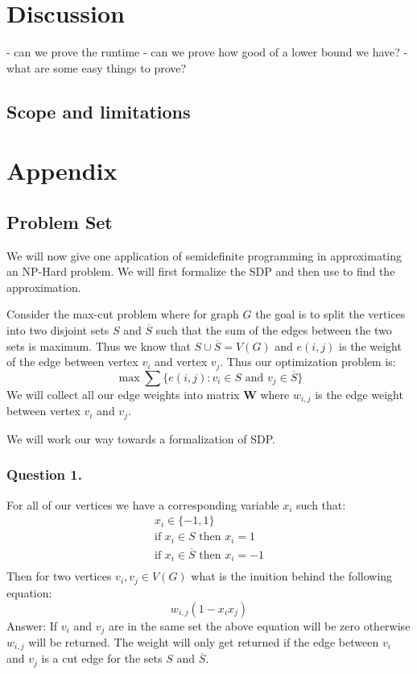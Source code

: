 \documentclass{article}
\begin{document}
\section{Discussion}


- can we prove the runtime
- can we prove how good of a lower bound we have?
- what are some easy things to prove?

\subsection{Scope and limitations}

\section{Appendix}
\subsection{Problem Set}
We will now give one application of semidefinite programming in approximating an NP-Hard problem.
We will first formalize the SDP and then use to find the approximation.

Consider the max-cut problem where for graph \( G \) the goal is to split the vertices into two disjoint sets \( S \) and \( \overline{S} \) such that the sum of the edges between the two sets is maximum.
Thus we know that \( S \cup \overline{S} = V(G) \) and \( e(i, j) \) is the weight of the edge between vertex \( v_i \) and vertex \( v_j \).
Thus our optimization problem is:
\[
  \max \sum \{ e(i, j): v_i \in S \text{ and } v_j \in \overline{S} \}
\]
We will collect all our edge weights into matrix \( \mathbf{W} \) where \( w_{i, j} \) is the edge weight between vertex \( v_i \) and \( v_j \).

We will work our way towards a formalization of SDP.
\subsubsection{Question 1.}
For all of our vertices we have a corresponding variable \( x_i \) such that:
\begin{gather*}
x_i \in \{ -1, 1 \} \\
\text{if } x_i \in S \text{ then } x_i = 1 \\
\text{if } x_i \in \overline{S} \text{ then } x_i = -1 \\
\end{gather*}
Then for two vertices \( v_i, v_j \in V(G) \) what is the inuition behind the following equation:
\[
w_{i, j}(1 - x_i x_j)
\]
Answer: If \( v_i \) and \( v_j \) are in the same set the above equation will be zero otherwise \( w_{i, j} \) will be returned. The weight will only get returned if the edge between \( v_i \) and \( v_j \) is a cut edge for the sets \( S \) and \( \overline{S} \).
\end{document}
